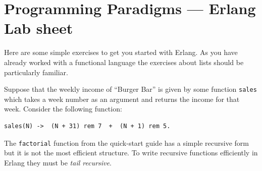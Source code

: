 \documentclass[12pt]{exam}
\begin{document}
\section*{Programming Paradigms --- Erlang Lab sheet}

Here are some simple exercises to get you started with Erlang. 
As you have already worked with a functional language the exercises about lists should be particularly familiar.
\begin{questions}
\question\label{first}
Suppose that the weekly income of ``Burger Bar'' is given by some function \texttt{sales} which takes a 
week number as an argument and returns the income for that week. 
Consider the following function:
\begin{Verbatim}
sales(N) ->  (N + 31) rem 7  +  (N + 1) rem 5.
\end{Verbatim}

\question
The \texttt{factorial} function from the quick-start guide has a simple recursive form 
but it is not the most efficient structure. 
To write recursive functions efficiently in Erlang they must be \emph{tail recursive}. 


\end{questions}
\end{document}
